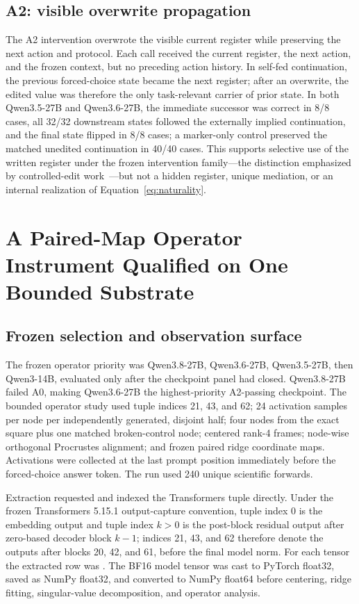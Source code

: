 \documentclass[10pt,a4paper]{article}
\newcommand{\code}[1]{\texttt{\detokenize{#1}}}
\begin{document}
\subsection{A2: visible overwrite propagation}

The A2 intervention overwrote the visible current register while preserving the next action and protocol. Each call received the current register, the next action, and the frozen context, but no preceding action history. In self-fed continuation, the previous forced-choice state became the next register; after an overwrite, the edited value was therefore the only task-relevant carrier of prior state. In both Qwen3.5-27B and Qwen3.6-27B, the immediate successor was correct in 8/8 cases, all 32/32 downstream states followed the externally implied continuation, and the final state flipped in 8/8 cases; a marker-only control preserved the matched unedited continuation in 40/40 cases. This supports selective use of the written register under the frozen intervention family---the distinction emphasized by controlled-edit work~\cite{somov2026}---but not a hidden register, unique mediation, or an internal realization of Equation~\eqref{eq:naturality}.

\section{A Paired-Map Operator Instrument Qualified on One Bounded Substrate}
\label{sec:operator}

\subsection{Frozen selection and observation surface}

The frozen operator priority was Qwen3.8-27B, Qwen3.6-27B, Qwen3.5-27B, then Qwen3-14B, evaluated only after the checkpoint panel had closed. Qwen3.8-27B failed A0, making Qwen3.6-27B the highest-priority A2-passing checkpoint. The bounded operator study used tuple indices 21, 43, and 62; 24 activation samples per node per independently generated, disjoint half; four nodes from the exact square plus one matched broken-control node; centered rank-4 frames; node-wise orthogonal Procrustes alignment; and frozen paired ridge coordinate maps. Activations were collected at the last prompt position immediately before the forced-choice answer token. The run used 240 unique scientific forwards.

Extraction requested \code{output_hidden_states=True} and indexed the Transformers \code{hidden_states} tuple directly. Under the frozen Transformers 5.15.1 output-capture convention, tuple index 0 is the embedding output and tuple index $k>0$ is the post-block residual output after zero-based decoder block $k-1$; indices 21, 43, and 62 therefore denote the outputs after blocks 20, 42, and 61, before the final model norm. For each tensor the extracted row was \code{hidden_states[k][0,-1,:]}. The BF16 model tensor was cast to PyTorch float32, saved as NumPy float32, and converted to NumPy float64 before centering, ridge fitting, singular-value decomposition, and operator analysis.
\end{document}

